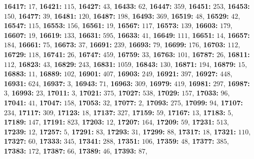 \textsf{\bfseries 16417:} $17$, \textsf{\bfseries 16421:} $115$, \textsf{\bfseries 16427:} $43$, \textsf{\bfseries 16433:} $62$, \textsf{\bfseries 16447:} $359$, \textsf{\bfseries 16451:} $253$, \textsf{\bfseries 16453:} $150$, \textsf{\bfseries 16477:} $39$, \textsf{\bfseries 16481:} $120$, \textsf{\bfseries 16487:} $198$, \textsf{\bfseries 16493:} $369$, \textsf{\bfseries 16519:} $48$, \textsf{\bfseries 16529:} $42$, \textsf{\bfseries 16547:} $115$, \textsf{\bfseries 16553:} $156$, \textsf{\bfseries 16561:} $19$, \textsf{\bfseries 16567:} $117$, \textsf{\bfseries 16573:} $139$, \textsf{\bfseries 16603:} $179$, \textsf{\bfseries 16607:} $19$, \textsf{\bfseries 16619:} $133$, \textsf{\bfseries 16631:} $595$, \textsf{\bfseries 16633:} $41$, \textsf{\bfseries 16649:} $111$, \textsf{\bfseries 16651:} $14$, \textsf{\bfseries 16657:} $184$, \textsf{\bfseries 16661:} $75$, \textsf{\bfseries 16673:} $37$, \textsf{\bfseries 16691:} $239$, \textsf{\bfseries 16693:} $79$, \textsf{\bfseries 16699:} $176$, \textsf{\bfseries 16703:} $112$, \textsf{\bfseries 16729:} $118$, \textsf{\bfseries 16741:} $26$, \textsf{\bfseries 16747:} $459$, \textsf{\bfseries 16759:} $33$, \textsf{\bfseries 16763:} $101$, \textsf{\bfseries 16787:} $26$, \textsf{\bfseries 16811:} $112$, \textsf{\bfseries 16823:} $43$, \textsf{\bfseries 16829:} $243$, \textsf{\bfseries 16831:} $1059$, \textsf{\bfseries 16843:} $130$, \textsf{\bfseries 16871:} $194$, \textsf{\bfseries 16879:} $15$, \textsf{\bfseries 16883:} $11$, \textsf{\bfseries 16889:} $102$, \textsf{\bfseries 16901:} $407$, \textsf{\bfseries 16903:} $249$, \textsf{\bfseries 16921:} $397$, \textsf{\bfseries 16927:} $448$, \textsf{\bfseries 16931:} $624$, \textsf{\bfseries 16937:} $3$, \textsf{\bfseries 16943:} $71$, \textsf{\bfseries 16963:} $309$, \textsf{\bfseries 16979:} $419$, \textsf{\bfseries 16981:} $297$, \textsf{\bfseries 16987:} $3$, \textsf{\bfseries 16993:} $23$, \textsf{\bfseries 17011:} $3$, \textsf{\bfseries 17021:} $375$, \textsf{\bfseries 17027:} $538$, \textsf{\bfseries 17029:} $157$, \textsf{\bfseries 17033:} $96$, \textsf{\bfseries 17041:} $41$, \textsf{\bfseries 17047:} $158$, \textsf{\bfseries 17053:} $32$, \textsf{\bfseries 17077:} $2$, \textsf{\bfseries 17093:} $275$, \textsf{\bfseries 17099:} $94$, \textsf{\bfseries 17107:} $234$, \textsf{\bfseries 17117:} $309$, \textsf{\bfseries 17123:} $18$, \textsf{\bfseries 17137:} $327$, \textsf{\bfseries 17159:} $59$, \textsf{\bfseries 17167:} $13$, \textsf{\bfseries 17183:} $5$, \textsf{\bfseries 17189:} $147$, \textsf{\bfseries 17191:} $823$, \textsf{\bfseries 17203:} $12$, \textsf{\bfseries 17207:} $164$, \textsf{\bfseries 17209:} $59$, \textsf{\bfseries 17231:} $513$, \textsf{\bfseries 17239:} $12$, \textsf{\bfseries 17257:} $5$, \textsf{\bfseries 17291:} $83$, \textsf{\bfseries 17293:} $31$, \textsf{\bfseries 17299:} $88$, \textsf{\bfseries 17317:} $18$, \textsf{\bfseries 17321:} $110$, \textsf{\bfseries 17327:} $60$, \textsf{\bfseries 17333:} $345$, \textsf{\bfseries 17341:} $288$, \textsf{\bfseries 17351:} $106$, \textsf{\bfseries 17359:} $48$, \textsf{\bfseries 17377:} $385$, \textsf{\bfseries 17383:} $172$, \textsf{\bfseries 17387:} $66$, \textsf{\bfseries 17389:} $46$, \textsf{\bfseries 17393:} $87$, 
